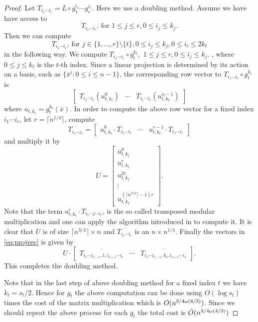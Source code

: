 \begin{proof}
Let $T_{i_1\cdots i_r} = L \circ g_1^{i_1}\cdots g_r^{i_r}$. Here we use a doubling method. Assume we have have access to 
$$T_{i_1\cdots i_r}, \, \mathrm{for}\,\, 1\leq j \leq r, 0 \leq i_j \leq k_j.$$
Then we can compute 
$$T_{i_1\cdots i_r}, \, \mathrm{for}\,\, j \in \lbrace 1, \ldots, r\rbrace \setminus \lbrace t \rbrace, 0 \leq i_j \leq k_j, 0 \leq i_t \leq 2k_t$$
in the following way. We compute 
$T_{i_1 \cdots i_r} \circ g_t^{k_t}, \,\, 1\leq j \leq r, 0 \leq i_j \leq k_j.$
, where $0\leq j \leq k_t$ is the $t$-th index. Since a linear projection is determined by its action on a basis, such as 
$\lbrace\bar{x}^i: 0\leq i \leq n-1 \rbrace$, the corresponding row vector to $T_{i_1 \cdots i_r} \circ g_t^{k_t}$ is 
\begin{equation}\label{eq:projvec}
\begin{bmatrix} T_{i_1 \cdots i_r}(u_{t,k_t}^0) & \cdots & T_{i_1 \cdots i_r}(u_{t,k_t}^{n-1}) \end{bmatrix}
\end{equation}
where $u_{t,k_t} = g_t^{k_t}(\bar{x})$. In order to compute the above row vector for a fixed index $i_1 \cdots i_r$, let $r = \lceil n^{1/4} \rceil$, compute
$$\overline{T_{i_1 \cdots i_r}} = \left[\begin{array}{c|c|c}
u_{t,k_t}^0\cdot T_{i_1 \cdots i_r} & \cdots & u_{t,k_t}^{r-1}\cdot T_{i_1 \cdots i_r}
\end{array} \right]$$
and multiply it by 
$$ U = \left[
\begin{array}{c}
u_{t,k_t}^0\\
\hline
u_{t,k_t}^{r}\\
\hline
u_{t,k_t}^{2r}\\
\hline
\vdots\\
\hline
u_{t,k_t}^{(\lceil n^{3/4} \rceil-1)r}
\end{array} \right].$$
Note that the term $u_{t,k_t}^i \cdot T_{i_1 \cdots j \cdots i_r}$, is the so called transposed modular multiplication and one can apply the algorithm introduced in \cite{Shoup} to compute it. It is clear that $U$ is of size 
$\lceil n^{3/4} \rceil \times n$ and $\overline{T_{i_1 \cdots i_r}}$ is an $n \times n^{1/4}$. Finally the vectors in \eqref{eq:projvec}
is given by
$$U \cdot \left[\begin{array}{c|c|c}
\overline{T_{i_1 \cdots i_{t-1},1, i_{t+1} \cdots i_r}} & \cdots & \overline{T_{i_1 \cdots i_{t-1},k_t,i_{t+1} \cdots i_r}}
\end{array}\right].
$$
This completes the doubling method.

Note that in the last step of above doubling method for a fixed index $t$ we have $k_t = s_t/2$. Hence for $g_t$ the above computation can be done 
using $O(\log s_t)$ times the cost of the matrix multiplication which is $O(n^{3/4 \omega(4/3)})$. Since we should repeat the above process for each $g_t$ the total cost is
$\tilde{O}(n^{3/4 \omega(4/3)})$ 
\end{proof}

